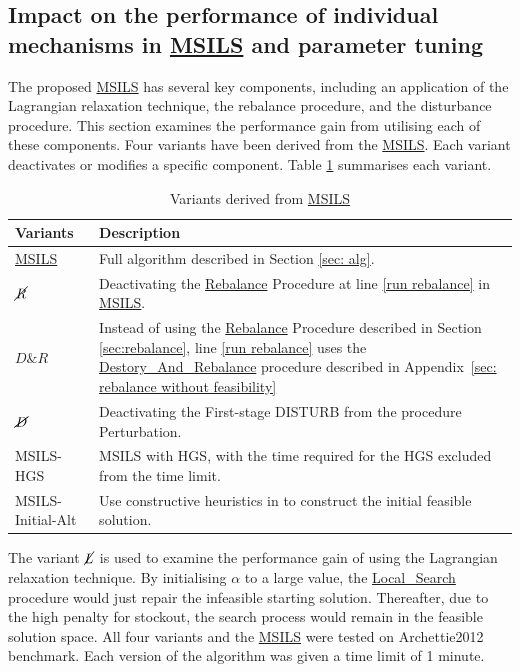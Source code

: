 \documentclass{article}
\begin{document}



\subsection{Impact on the performance of individual mechanisms in \hyperref[alg:MSILS]{MSILS} and parameter tuning} \label{sec: tuning}


The proposed \hyperref[alg:MSILS]{MSILS} has several key components, including an application of the Lagrangian relaxation technique, the rebalance procedure, and the disturbance procedure. This section examines the performance gain from utilising each of these components. Four variants have been derived from the \hyperref[alg:MSILS]{MSILS}. Each variant deactivates or modifies a specific component. Table \ref{Variants of MSILS} summarises each variant.

\begin{table}\small
\caption{Variants derived from \hyperref[alg:MSILS]{MSILS}}
\label{Variants of MSILS}
\centering
\begin{tabular}{ p{1.5cm}p{10cm}}
\toprule%
\textbf{Variants} & \textbf{Description} \tabularnewline
\hline

\hyperref[alg:MSILS]{MSILS}& Full algorithm described in Section \ref{sec: alg}.  \tabularnewline
$\cancel{R}$ & Deactivating the \hyperref[alg:rebalance]{Rebalance} Procedure at line \ref{run rebalance} in \hyperref[alg:MSILS]{MSILS}. \tabularnewline
$D\&R$ & Instead of using the \hyperref[alg:rebalance]{Rebalance} Procedure described in Section \ref{sec:rebalance}, line \ref{run rebalance} uses the \hyperref[alg: destroy and rebalance]{Destory\_And\_Rebalance} procedure described in Appendix~\ref{sec: rebalance without feasibility}\tabularnewline
$\cancel{D}$ & Deactivating the First-stage DISTURB from the procedure Perturbation. \tabularnewline
MSILS-HGS& MSILS with HGS, with the time required for the HGS excluded from the time limit.\tabularnewline
MSILS-Initial-Alt& Use constructive heuristics in \cite{alvarez2018iterated} to construct the initial feasible solution. \tabularnewline
\hline
\end{tabular}
\end{table}

The variant $\cancel{L}$ is used to examine the performance gain of using the Lagrangian relaxation technique. By initialising $\alpha$ to a large value, the \hyperref[alg:LocalSearch]{Local\_Search} procedure would just repair the infeasible starting solution. Thereafter, due to the high penalty for stockout, the search process would remain in the feasible solution space. All four variants and the \hyperref[alg:MSILS]{MSILS} were tested on Archettie2012 benchmark. Each version of the algorithm was given a time limit of 1 minute. 
\end{document}
